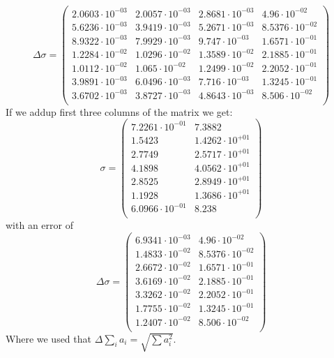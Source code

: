\documentclass[]{article}
\begin{document}
\begin{equation}
\Delta\sigma=\begin{pmatrix}
   2.0603\cdot 10^{-03} & 2.0057\cdot 10^{-03} & 2.8681\cdot 10^{-03} & 4.96\cdot 10^{-02} \\
   5.6236\cdot 10^{-03} & 3.9419\cdot 10^{-03} & 5.2671\cdot 10^{-03} & 8.5376\cdot 10^{-02} \\
   8.9322\cdot 10^{-03} & 7.9929\cdot 10^{-03} & 9.747\cdot 10^{-03} & 1.6571\cdot 10^{-01} \\
   1.2284\cdot 10^{-02} & 1.0296\cdot 10^{-02} & 1.3589\cdot 10^{-02} & 2.1885\cdot 10^{-01} \\
   1.0112\cdot 10^{-02} & 1.065\cdot 10^{-02} & 1.2499\cdot 10^{-02} & 2.2052\cdot 10^{-01} \\
   3.9891\cdot 10^{-03} & 6.0496\cdot 10^{-03} & 7.716\cdot 10^{-03} & 1.3245\cdot 10^{-01} \\
   3.6702\cdot 10^{-03} & 3.8727\cdot 10^{-03} & 4.8643\cdot 10^{-03} & 8.506\cdot 10^{-02} \\
\end{pmatrix}
\end{equation}
If we addup first three columns of the matrix we get:
\begin{equation}
\sigma=
\begin{pmatrix}
   7.2261\cdot 10^{-01} & 7.3882 \\
   1.5423 & 1.4262\cdot 10^{+01} \\
   2.7749 & 2.5717\cdot 10^{+01} \\
   4.1898 & 4.0562\cdot 10^{+01} \\
   2.8525 & 2.8949\cdot 10^{+01} \\
   1.1928 & 1.3686\cdot 10^{+01} \\
   6.0966\cdot 10^{-01} & 8.238 \\
\end{pmatrix}
\end{equation}
with an error of
\begin{equation}
\Delta\sigma=
\begin{pmatrix}
   6.9341\cdot 10^{-03} & 4.96\cdot 10^{-02} \\
   1.4833\cdot 10^{-02} & 8.5376\cdot 10^{-02} \\
   2.6672\cdot 10^{-02} & 1.6571\cdot 10^{-01} \\
   3.6169\cdot 10^{-02} & 2.1885\cdot 10^{-01} \\
   3.3262\cdot 10^{-02} & 2.2052\cdot 10^{-01} \\
   1.7755\cdot 10^{-02} & 1.3245\cdot 10^{-01} \\
   1.2407\cdot 10^{-02} & 8.506\cdot 10^{-02} \\
\end{pmatrix}
\end{equation}
Where we used that $\Delta\sum_i a_i=\sqrt{\sum a_i^2}$.

\pagebreak
\nocite{*}
\printbibliography
\end{document}
